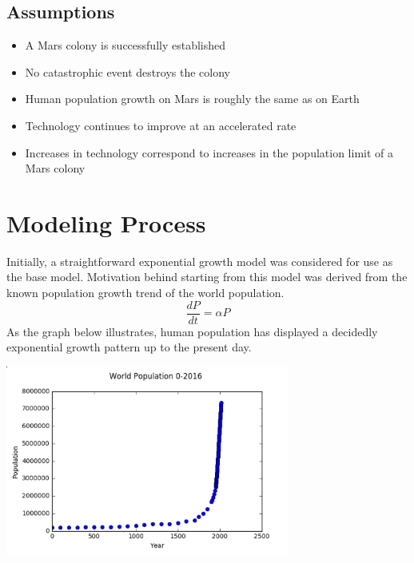 \documentclass[12pt]{article}
\begin{document}
\subsection{Assumptions}
\begin{itemize}  
\item A Mars colony is successfully established
\item No catastrophic event destroys the colony
\item Human population growth on Mars is roughly the same as on Earth
\item Technology continues to improve at an accelerated rate\cite{moore}
\item Increases in technology correspond to increases in the population limit of a Mars colony
\end{itemize}


\section*{}




\section{Modeling Process}


Initially, a straightforward exponential growth model was considered for use as the base model. Motivation behind starting from this model was derived from the known population growth trend of the world population. 
\begin{equation} \frac{dP}{dt} = \alpha P \end{equation}
As the graph below illustrates, human population has displayed a decidedly exponential growth pattern up to the present day.


\begin{minipage}{\textwidth}
		\centering
		\includegraphics[width=0.7\textwidth]{worldPop}
\end{minipage}\hfill
\end{document}
